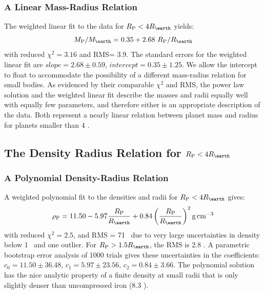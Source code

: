 \documentclass[iop]{emulateapj}
\newcommand{\rspecial}{4 \rearth}
\begin{document}
\subsubsection{A Linear Mass-Radius Relation}
The weighted linear fit to the data for $\rpl < \rspecial$ yields:
\begin{equation}
\mpl/\mearth = 0.35 + 2.68~\rpl/\rearth
\label{eqn:mr_linear}
\end{equation}
with reduced $\chi^2=3.16$ and RMS= 3.9\mearth.  The standard errors for the weighted linear fit are $slope = 2.68 \pm 0.59$, $intercept= 0.35\pm1.25$.  We allow the intercept to float to accommodate the possibility of a different mass-radius relation for small bodies.  As evidenced by their comparable $\chi^2$ and RMS, the power law solution and the weighted linear fit describe the masses and radii equally well with equally few parameters, and therefore either is an appropriate description of the data. Both represent a nearly linear relation between planet mass and radius for planets smaller than 4 \rearth.

\subsection{The Density Radius Relation for $\rpl < \rspecial$}
\subsubsection{A Polynomial Density-Radius Relation}
A weighted polynomial fit to the densities and radii for $\rpl < \rspecial$ gives:
\begin{equation}
\rhopl = 11.50 - 5.97 \frac{\rpl}{\rearth} + 0.84 \left(\frac{\rpl}{\rearth}\right)^{2} \gcc
\label{eqn:dr_poly}
\end{equation}
with reduced $\chi^2=2.5$, and RMS = 71 \gcc\ due to very large uncertainties in density below 1 \rearth\ and one outlier.  For $\rpl > 1.5 \rearth$, the RMS is 2.8 \gcc.  A parametric bootstrap error analysis of 1000 trials gives these uncertainties in the coefficients: $c_0 =11.50 \pm 36.48$, $c_1 = 5.97 \pm 23.56$, $c_2 = 0.84\pm3.66$.   The polynomial solution has the nice analytic property of a finite density at small radii that is only slightly denser than uncompressed iron (8.3 \gcc).
\end{document}
